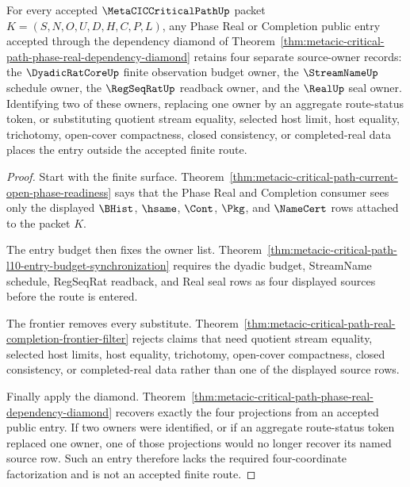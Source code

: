 \begin{theorem}
\label{thm:metacic-critical-path-four-source-owner-noncollapse}
For every accepted $\MetaCICCriticalPathUp$ packet $K=(S,N,O,U,D,H,C,P,L)$, any Phase Real or Completion public entry accepted through the dependency diamond of Theorem~\ref{thm:metacic-critical-path-phase-real-dependency-diamond} retains four separate source-owner records: the $\DyadicRatCoreUp$ finite observation budget owner, the $\StreamNameUp$ schedule owner, the $\RegSeqRatUp$ readback owner, and the $\RealUp$ seal owner. Identifying two of these owners, replacing one owner by an aggregate route-status token, or substituting quotient stream equality, selected host limit, host equality, trichotomy, open-cover compactness, closed consistency, or completed-real data places the entry outside the accepted finite route.
\end{theorem}
\begin{proof}
Start with the finite surface. Theorem~\ref{thm:metacic-critical-path-current-open-phase-readiness} says that the Phase Real and Completion consumer sees only the displayed $\BHist$, $\hsame$, $\Cont$, $\Pkg$, and $\NameCert$ rows attached to the packet $K$.

The entry budget then fixes the owner list. Theorem~\ref{thm:metacic-critical-path-l10-entry-budget-synchronization} requires the dyadic budget, StreamName schedule, RegSeqRat readback, and Real seal rows as four displayed sources before the route is entered.

The frontier removes every substitute. Theorem~\ref{thm:metacic-critical-path-real-completion-frontier-filter} rejects claims that need quotient stream equality, selected host limits, host equality, trichotomy, open-cover compactness, closed consistency, or completed-real data rather than one of the displayed source rows.

Finally apply the diamond. Theorem~\ref{thm:metacic-critical-path-phase-real-dependency-diamond} recovers exactly the four projections from an accepted public entry. If two owners were identified, or if an aggregate route-status token replaced one owner, one of those projections would no longer recover its named source row. Such an entry therefore lacks the required four-coordinate factorization and is not an accepted finite route.
\end{proof}

